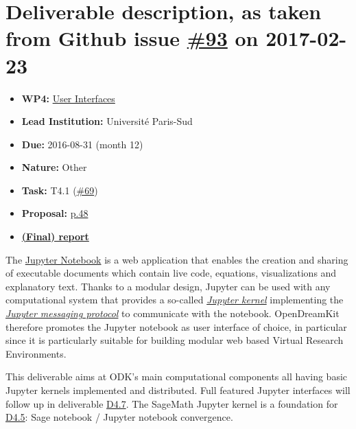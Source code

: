 \section*{\texorpdfstring{Deliverable description, as taken from Github
issue
\href{https://github.com/OpenDreamKit/OpenDreamKit/issues/93}{\#93} on
2017-02-23}{Deliverable description, as taken from Github issue \#93 on 2017-02-23}}\label{deliverable-description-as-taken-from-github-issue-93-on-2017-02-23}

\begin{itemize}
\tightlist
\item
  \textbf{WP4:}
  \href{https://github.com/OpenDreamKit/OpenDreamKit/tree/master/WP4}{User
  Interfaces}
\item
  \textbf{Lead Institution:} Université Paris-Sud
\item
  \textbf{Due:} 2016-08-31 (month 12)
\item
  \textbf{Nature:} Other
\item
  \textbf{Task:} T4.1
  (\href{https://github.com/OpenDreamKit/OpenDreamKit/issues/69}{\#69})
\item
  \textbf{Proposal:}
  \href{https://github.com/OpenDreamKit/OpenDreamKit/raw/master/Proposal/proposal-www.pdf}{p.48}
\item
  \textbf{\href{https://github.com/OpenDreamKit/OpenDreamKit/raw/master/WP4/D4.4/report-final.pdf}{(Final)
  report}}
\end{itemize}

The \href{https://jupyter.org}{Jupyter Notebook} is a web application
that enables the creation and sharing of executable documents which
contain live code, equations, visualizations and explanatory text.
Thanks to a modular design, Jupyter can be used with any computational
system that provides a so-called
\href{https://jupyter.readthedocs.io/en/latest/projects/kernels.html}{\emph{Jupyter
kernel}} implementing the
\href{https://jupyter-client.readthedocs.io/en/latest/}{\emph{Jupyter
messaging protocol}} to communicate with the notebook. OpenDreamKit
therefore promotes the Jupyter notebook as user interface of choice, in
particular since it is particularly suitable for building modular web
based Virtual Research Environments.

This deliverable aims at ODK's main computational components all having
basic Jupyter kernels implemented and distributed. Full featured Jupyter
interfaces will follow up in deliverable
\href{https://github.com/OpenDreamKit/OpenDreamKit/issues/96}{D4.7}. The
SageMath Jupyter kernel is a foundation for
\href{https://github.com/OpenDreamKit/OpenDreamKit/issues/94}{D4.5}:
Sage notebook / Jupyter notebook convergence.


